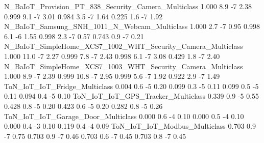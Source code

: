 N_BaIoT_Provision_PT_838_Security_Camera_Multiclass                   1.000                8.9           -7            2.38      0.999                   9.1              -7               3.01      0.984                   3.5              -7               1.64       0.225                    1.6               -7                1.92
N_BaIoT_Samsung_SNH_1011_N_Webcam_Multiclass                          1.000                2.7           -7            0.95      0.998                   6.1              -6               1.55      0.998                   2.3              -7               0.57       0.743                    0.9               -7                0.21
N_BaIoT_SimpleHome_XCS7_1002_WHT_Security_Camera_Multiclass           1.000               11.0           -7            2.27      0.999                   7.8              -7               2.43      0.998                   6.1              -7               3.08       0.429                    1.8               -7                2.40
N_BaIoT_SimpleHome_XCS7_1003_WHT_Security_Camera_Multiclass           1.000                8.9           -7            2.39      0.999                  10.8              -7               2.95      0.999                   5.6              -7               1.92       0.922                    2.9               -7                1.49
ToN_IoT_IoT_Fridge_Multiclass                                         0.004                0.6           -5            0.20      0.099                   0.3              -5               0.11      0.099                   0.5              -5               0.11       0.094                    0.4               -5                0.10
ToN_IoT_IoT_GPS_Tracker_Multiclass                                    0.339                0.9           -5            0.55      0.428                   0.8              -5               0.20      0.423                   0.6              -5               0.20       0.282                    0.8               -5                0.26
ToN_IoT_IoT_Garage_Door_Multiclass                                    0.000                0.6           -4            0.10      0.000                   0.5              -4               0.10      0.000                   0.4              -3               0.10       0.119                    0.4               -4                0.09
ToN_IoT_IoT_Modbus_Multiclass                                         0.703                0.9           -7            0.75      0.703                   0.9              -7               0.46      0.703                   0.6              -7               0.45       0.703                    0.8               -7                0.45
